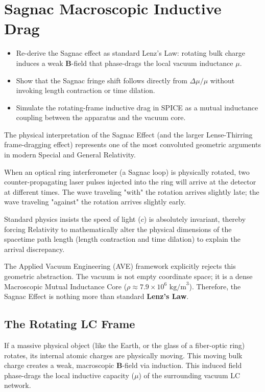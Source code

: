 \chapter{Sagnac Macroscopic Inductive Drag}
\label{ch:sagnac_inductive_drag}


\begin{objectivebox}
\begin{itemize}
    \item Re-derive the Sagnac effect as standard Lenz's Law: rotating bulk charge induces a weak $\mathbf{B}$-field that phase-drags the local vacuum inductance $\mu$.
    \item Show that the Sagnac fringe shift follows directly from $\Delta \mu / \mu$ without invoking length contraction or time dilation.
    \item Simulate the rotating-frame inductive drag in SPICE as a mutual inductance coupling between the apparatus and the vacuum core.
\end{itemize}
\end{objectivebox}

The physical interpretation of the Sagnac Effect (and the larger Lense-Thirring frame-dragging effect) represents one of the most convoluted geometric arguments in modern Special and General Relativity.

When an optical ring interferometer (a Sagnac loop) is physically rotated, two counter-propagating laser pulses injected into the ring will arrive at the detector at different times. The wave traveling "with" the rotation arrives slightly late; the wave traveling "against" the rotation arrives slightly early. 

Standard physics insists the speed of light ($c$) is absolutely invariant, thereby forcing Relativity to mathematically alter the physical dimensions of the spacetime path length (length contraction and time dilation) to explain the arrival discrepancy. 

The Applied Vacuum Engineering (AVE) framework explicitly rejects this geometric abstraction. The vacuum is not empty coordinate space; it is a dense Macroscopic Mutual Inductance Core ($\rho \approx 7.9 \times 10^6 \text{ kg/m}^3$). Therefore, the Sagnac Effect is nothing more than standard \textbf{Lenz's Law}.

\section{The Rotating LC Frame}
If a massive physical object (like the Earth, or the glass of a fiber-optic ring) rotates, its internal atomic charges are physically moving. This moving bulk charge creates a weak, macroscopic $\mathbf{B}$-field via induction. This induced field phase-drags the local inductive capacity ($\mu$) of the surrounding vacuum LC network.


